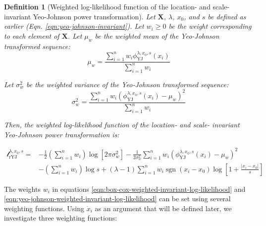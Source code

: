 \documentclass[
  a4paper,
]{article}
\newtheorem*{definition}{Definition}
\begin{document}
\begin{definition}[Weighted log-likelihood function of the location- and scale- invariant Yeo-Johnson power transformation]

Let $\mathbf{X}$, $\lambda$, $x_0$, and $s$ be defined as earlier (Eqn. \ref{eqn:yeo-johnson-invariant}).
Let $w_i \geq 0$ be the weight corresponding to each element of $\mathbf{X}$.
Let $\mu_w$ be the weighted mean of the Yeo-Johnson transformed sequence:
\begin{equation*}
\mu_w = \frac{\sum_{i=1}^n w_i \phi_{\text{YJ}}^{\lambda, x_0, s} (x_i)} {\sum_{i=1}^n w_i}
\end{equation*}

Let $\sigma^2_w$ be the weighted variance of the Yeo-Johnson transformed sequence:
\begin{equation*}
\sigma_w^2 = \frac{\sum_{i=1}^n w_i \left(\phi_{\text{YJ}}^{\lambda, x_0, s} (x_i) - \mu_w \right)^2}{\sum_{i=1}^n w_i}
\end{equation*}

Then, the weighted log-likelihood function of the location- and scale- invariant Yeo-Johnson power transformation is:

\begin{equation}
\label{eqn:yeo-johnson-weighted-invariant-log-likelihood}
\begin{split}
\mathcal{l}_{\text{rYJ}}^{\lambda, x_0, s} = & -\frac{1}{2} \left(\sum_{i=1}^n w_i \right) \log \left[ 2 \pi \sigma_w^2 \right] -\frac{1}{2 \sigma_w^2} \sum_{i=1}^n w_i \left( \phi_{\text{YJ}}^{\lambda, x_0, s}(x_i) - \mu_w \right)^2 \\
& - \left( \sum_{i=1}^n w_i \right) \log s + (\lambda - 1) \sum_{i=1}^n w_i \mathop{\mathrm{sgn}}(x_i - x_0) \log \left[1 + \frac{|x_i - x_0|}{s} \right]
\end{split}
\end{equation}
\end{definition}

The weights \(w_i\) in equations
\ref{eqn:box-cox-weighted-invariant-log-likelihood} and
\ref{eqn:yeo-johnson-weighted-invariant-log-likelihood} can be set using
several weighting functions. Using \(\dot{x}_i\) as an argument that
will be defined later, we investigate three weighting functions:
\end{document}
